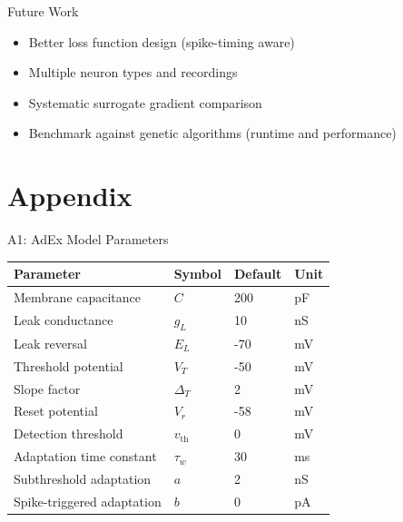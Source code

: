 \documentclass[17pt, t, lualatex]{beamer}
\begin{document}
\begin{frame}{Future Work}
\begin{center}
\begin{itemize}
  \item Better loss function design (spike-timing aware)
  \item Multiple neuron types and recordings
  \item Systematic surrogate gradient comparison
  \item Benchmark against genetic algorithms (runtime and performance)
\end{itemize}
\end{center}
\end{frame}


\appendix
\section{Appendix}
\insertsectionpage

\begin{frame}{A1: AdEx Model Parameters}
\begin{table}
\centering
\small
\begin{tabular}{llll}
\toprule
\textbf{Parameter} & \textbf{Symbol} & \textbf{Default} & \textbf{Unit} \\
\midrule
Membrane capacitance & $C$ & 200 & pF \\
Leak conductance & $g_L$ & 10 & nS \\
Leak reversal & $E_L$ & -70 & mV \\
Threshold potential & $V_T$ & -50 & mV \\
Slope factor & $\Delta_T$ & 2 & mV \\
Reset potential & $V_r$ & -58 & mV \\
Detection threshold & $v_{\text{th}}$ & 0 & mV \\
Adaptation time constant & $\tau_w$ & 30 & ms \\
Subthreshold adaptation & $a$ & 2 & nS \\
Spike-triggered adaptation & $b$ & 0 & pA \\
\bottomrule
\end{tabular}
\end{table}
\end{frame}
\end{document}
